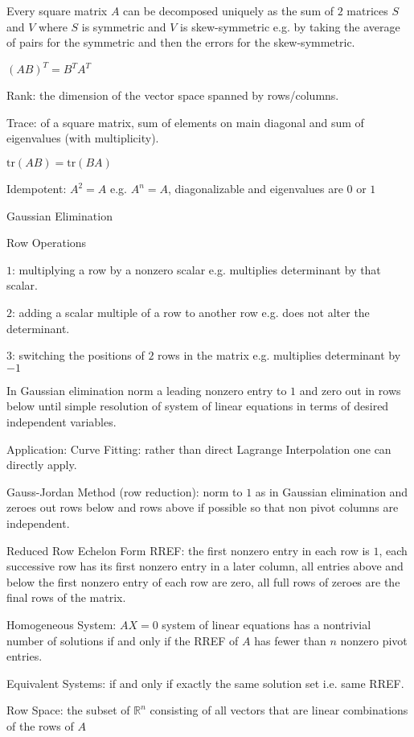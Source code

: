 Every square matrix $A$ can be decomposed uniquely as the sum of $2$ matrices $S$ and $V$ where $S$ is symmetric and $V$ is skew-symmetric e.g. by taking the average of pairs for the symmetric and then the errors for the skew-symmetric.

$(AB)^T=B^T A^T$

Rank: the dimension of the vector space spanned by rows/columns.

Trace: of a square matrix, sum of elements on main diagonal and sum of eigenvalues (with multiplicity).

$\text{tr}(AB)=\text{tr}(BA)$

Idempotent: $A^2=A$ e.g. $A^n=A$, diagonalizable and eigenvalues are $0$ or $1$

Gaussian Elimination

Row Operations

$1$: multiplying a row by a nonzero scalar e.g. multiplies determinant by that scalar.

$2$: adding a scalar multiple of a row to another row e.g. does not alter the determinant.

$3$: switching the positions of $2$ rows in the matrix e.g. multiplies determinant by $-1$

In Gaussian elimination norm a leading nonzero entry to $1$ and zero out in rows below until simple resolution of system of linear equations in terms of desired independent variables.

Application: Curve Fitting: rather than direct Lagrange Interpolation one can directly apply.

Gauss-Jordan Method (row reduction): norm to $1$ as in Gaussian elimination and zeroes out rows below and rows above if possible so that non pivot columns are independent.

Reduced Row Echelon Form RREF: the first nonzero entry in each row is $1$, each successive row has its first nonzero entry in a later column, all entries above and below the first nonzero entry of each row are zero, all full rows of zeroes are the final rows of the matrix.

Homogeneous System: $AX=0$ system of linear equations has a nontrivial number of solutions if and only if the RREF of $A$ has fewer than $n$ nonzero pivot entries.

Equivalent Systems: if and only if exactly the same solution set i.e. same RREF.

Row Space: the subset of $\mathbb{R}^n$ consisting of all vectors that are linear combinations of the rows of $A$

